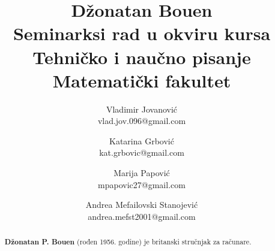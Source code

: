 \documentclass[a4paper]{article}
\begin{document}
\title{Džonatan Bouen\\ \small{Seminarksi rad u okviru kursa\\Tehničko i naučno pisanje\\Matematički fakultet}}

\author{Vladimir Jovanović\\vlad.jov.096@gmail.com \and Katarina Grbović\\kat.grbovic@gmail.com \and Marija Papović\\mpapovic27@gmail.com\and Andrea Mefailovski Stanojević\\andrea.mefst2001@gmail.com}
\date{}
\maketitle

\begin{abstract}
\textbf{Džonatan P. Bouen} (rođen 1956. godine) je britanski stručnjak za računare.
\end{abstract}

\tableofcontents
\newpage
\end{document}

